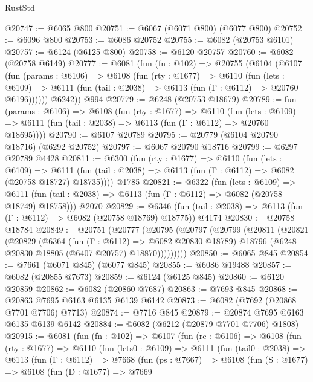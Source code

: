 \begin{lexlean}{RustStd}
\begin{coremodule}
@20747 := @6065 @800
@20751 := @6067 (@6071 @800) (@6077 @800)
@20752 := @6096 @800
@20753 := @6086 @20752
@20755 := @6082 (@20753 @6101)
@20757 := @6124 (@6125 @800)
@20758 := @6120 @20757
@20760 := @6082 (@20758 @6149)
@20777 := @6081
    (fun (fn : @102) =>
    @20755
      (@6104
        (@6107
          (fun (params : @6106) =>
          @6108
            (fun (rty : @1677) =>
            @6110
              (fun (lets : @6109) =>
              @6111 (fun (tail : @2038) => @6113 (fun (Γ : @6112) => @20760 @6196))))))
        @6242))
    @994
@20779 := @6248 (@20753 @18679)
@20789 := fun (params : @6106) =>
  @6108
    (fun (rty : @1677) =>
    @6110
      (fun (lets : @6109) =>
      @6111 (fun (tail : @2038) => @6113 (fun (Γ : @6112) => @20760 @18695))))
@20790 := @6107 @20789
@20795 := @20779 (@6104 @20790 @18716) (@6292 @20752)
@20797 := @6067 @20790 @18716
@20799 := @6297 @20789 @4428
@20811 := @6300
    (fun (rty : @1677) =>
    @6110
      (fun (lets : @6109) =>
      @6111 (fun (tail : @2038) => @6113 (fun (Γ : @6112) => @6082 (@20758 @18727) @18735))))
    @1785
@20821 := @6322
    (fun (lets : @6109) =>
    @6111 (fun (tail : @2038) => @6113 (fun (Γ : @6112) => @6082 (@20758 @18749) @18758)))
    @2070
@20829 := @6346
    (fun (tail : @2038) => @6113 (fun (Γ : @6112) => @6082 (@20758 @18769) @18775))
    @4174
@20830 := @20758 @18784
@20849 := @20751
    (@20777
      (@20795
        (@20797
          (@20799
            (@20811
              (@20821
                (@20829
                  (@6364
                    (fun (Γ : @6112) => @6082 @20830 @18789)
                    @18796
                    (@6248 @20830 @18805 (@6407 @20757) @18870)))))))))
@20850 := @6065 @845
@20854 := @7661 (@6071 @845) (@6077 @845)
@20855 := @6086 @19488
@20857 := @6082 (@20855 @7673)
@20859 := @6124 (@6125 @845)
@20860 := @6120 @20859
@20862 := @6082 (@20860 @7687)
@20863 := @7693 @845
@20868 := @20863 @7695 @6163 @6135 @6139 @6142
@20873 := @6082 (@7692 (@20868 @7701 @7706) @7713)
@20874 := @7716 @845
@20879 := @20874 @7695 @6163 @6135 @6139 @6142
@20884 := @6082 (@6212 (@20879 @7701 @7706) @1808)
@20915 := @6081
    (fun (fn : @102) =>
    @6107
      (fun (rc : @6106) =>
      @6108
        (fun (rty : @1677) =>
        @6110
          (fun (lets0 : @6109) =>
          @6111
            (fun (tail0 : @2038) =>
            @6113
              (fun (Γ : @6112) =>
              @7668
                (fun (ps : @7667) =>
                @6108
                  (fun (S : @1677) =>
                  @6108
                    (fun (D : @1677) =>
                    @7669

\end{coremodule}
\end{lexlean}
